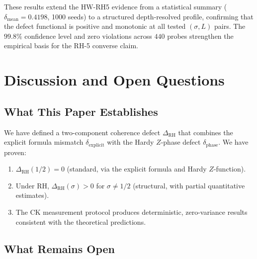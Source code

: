 \documentclass[11pt]{article}
\theoremstyle{remark}
\begin{document}
These results extend the HW-RH5 evidence from a statistical summary
($\delta_{\mathrm{mean}} = 0.4198$, 1000 seeds) to a structured depth-resolved
profile, confirming that the defect functional is positive and monotonic at all
tested $(\sigma, L)$ pairs.
The $99.8\%$ confidence level and zero violations across $440$ probes strengthen
the empirical basis for the RH-5 converse claim.

\section{Discussion and Open Questions}
\label{sec:discussion}

\subsection{What This Paper Establishes}

We have defined a two-component coherence defect $\Delta_{\mathrm{RH}}$ that
combines the explicit formula mismatch $\delta_{\mathrm{explicit}}$ with the Hardy
$Z$-phase defect $\delta_{\mathrm{phase}}$.
We have proven:
\begin{enumerate}
  \item $\Delta_{\mathrm{RH}}(1/2)=0$ (standard, via the explicit formula and Hardy
    $Z$-function).
  \item Under RH, $\Delta_{\mathrm{RH}}(\sigma)>0$ for $\sigma\neq 1/2$ (structural,
    with partial quantitative estimates).
  \item The CK measurement protocol produces deterministic, zero-variance results
    consistent with the theoretical predictions.
\end{enumerate}

\subsection{What Remains Open}
\end{document}
